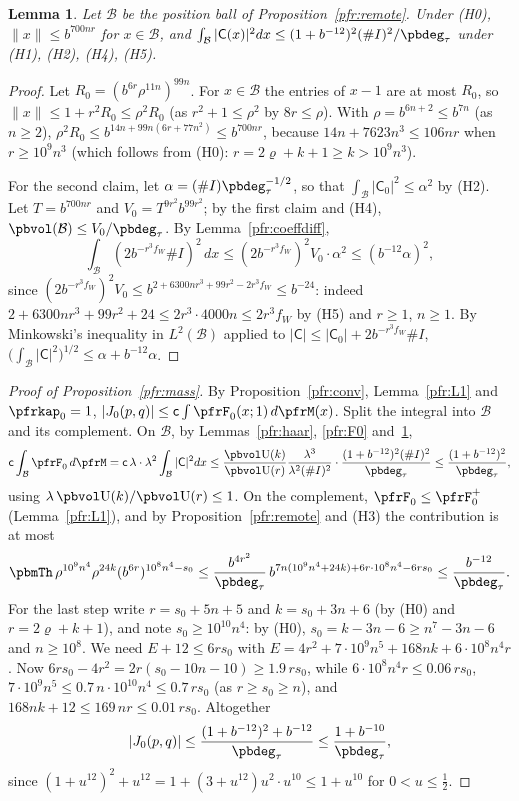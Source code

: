 \documentclass[10pt]{amsart}
\newtheorem{lemma}[theorem]{Lemma}
\theoremstyle{definition}
\theoremstyle{remark}
\providecommand{\auU}{\mathrm U}
\begin{document}
\begin{lemma}\label{pfr:ballnorm}
Let $\mathcal B$ be the position ball of Proposition~\ref{pfr:remote}. Under \textup{(H0)},
$\|x\|\le b^{700nr}$ for $x\in\mathcal B$, and
$\int_{\mathcal B}|\mathsf C(x)|^2dx\le(1+b^{-12})^2(\#I)^2/\pbdeg_\tau$ under \textup{(H1)}, \textup{(H2)},
\textup{(H4)}, \textup{(H5)}.
\end{lemma}
\begin{proof}
Let $R_0=(b^{6r}\rho^{11n})^{99n}$. For $x\in\mathcal B$ the entries of $x-1$ are at most $R_0$, so
$\|x\|\le1+r^2R_0\le\rho^2R_0$ (as $r^2+1\le\rho^2$ by $8r\le\rho$). With $\rho=b^{6n+2}\le b^{7n}$ (as $n\ge2$),
$\rho^2R_0\le b^{14n+99n(6r+77n^2)}\le b^{700nr}$, because $14n+7623n^3\le106nr$ when $r\ge10^9n^3$ (which
follows from (H0): $r=2\varrho+k+1\ge k>10^9n^3$).

For the second claim, let $\alpha=(\#I)\pbdeg_\tau^{-1/2}$, so that $\int_{\mathcal B}|\mathsf C_0|^2\le\alpha^2$ by
(H2). Let $T=b^{700nr}$ and $V_0=T^{9r^2}b^{99r^2}$; by the first claim and (H4),
$\pbvol(\mathcal B)\le V_0/\pbdeg_\tau$. By Lemma~\ref{pfr:coeffdiff},
\[
\int_{\mathcal B}(2b^{-r^3f_W}\#I)^2\,dx\le(2b^{-r^3f_W})^2V_0\cdot\alpha^2\le(b^{-12}\alpha)^2,
\]
since $(2b^{-r^3f_W})^2V_0\le b^{2+6300nr^3+99r^2-2r^3f_W}\le b^{-24}$: indeed $2+6300nr^3+99r^2+24\le
2r^3\cdot4000n\le2r^3f_W$ by (H5) and $r\ge1$, $n\ge1$. By Minkowski's inequality in $L^2(\mathcal B)$
applied to $|\mathsf C|\le|\mathsf C_0|+2b^{-r^3f_W}\#I$,
$\bigl(\int_{\mathcal B}|\mathsf C|^2\bigr)^{1/2}\le\alpha+b^{-12}\alpha$.
\end{proof}

\begin{proof}[Proof of Proposition~\ref{pfr:mass}]
By Proposition~\ref{pfr:conv}, Lemma~\ref{pfr:L1} and $\pfrkap_0=1$,
$|J_0(p,q)|\le\mathsf c\int\pfrF_0(x;1)\,d\pfrM(x)$. Split the integral into $\mathcal B$ and its
complement. On $\mathcal B$, by Lemmas~\ref{pfr:haar}, \ref{pfr:F0} and~\ref{pfr:ballnorm},
\[
\mathsf c\int_{\mathcal B}\pfrF_0\,d\pfrM=\mathsf c\,\lambda\cdot\lambda^2\int_{\mathcal B}|\mathsf C|^2dx\le
\frac{\pbvol\auU(k)}{\pbvol\auU(r)}\frac{\lambda^3}{\lambda^2(\#I)^2}\cdot\frac{(1+b^{-12})^2(\#I)^2}{\pbdeg_\tau}
\le\frac{(1+b^{-12})^2}{\pbdeg_\tau},
\]
using $\lambda\,\pbvol\auU(k)/\pbvol\auU(r)\le1$. On the complement, $\pfrF_0\le\pfrF_0^+$
(Lemma~\ref{pfr:L1}), and by Proposition~\ref{pfr:remote} and (H3) the contribution is at most
\[
\pbmTh\,\rho^{10^9n^4}\rho^{24k}(b^{6r})^{10^8n^4-s_0}\le\frac{b^{4r^2}}{\pbdeg_\tau}\,b^{7n(10^9n^4+24k)+6r\cdot
10^8n^4-6rs_0}\le\frac{b^{-12}}{\pbdeg_\tau}.
\]
For the last step write $r=s_0+5n+5$ and $k=s_0+3n+6$ (by (H0) and $r=2\varrho+k+1$), and note
$s_0\ge10^{10}n^4$: by (H0), $s_0=k-3n-6\ge n^7-3n-6$ and $n\ge10^8$. We need $E+12\le6rs_0$ with
$E=4r^2+7\cdot10^9n^5+168nk+6\cdot10^8n^4r$. Now $6rs_0-4r^2=2r(s_0-10n-10)\ge1.9\,rs_0$, while
$6\cdot10^8n^4r\le0.06\,rs_0$, $7\cdot10^9n^5\le0.7\,n\cdot10^{10}n^4\le0.7\,rs_0$ (as $r\ge s_0\ge n$),
and $168nk+12\le169\,nr\le0.01\,rs_0$. Altogether
\[
|J_0(p,q)|\le\frac{(1+b^{-12})^2+b^{-12}}{\pbdeg_\tau}\le\frac{1+b^{-10}}{\pbdeg_\tau},
\]
since $(1+u^{12})^2+u^{12}=1+(3+u^{12})u^2\cdot u^{10}\le1+u^{10}$ for $0<u\le\frac12$.
\end{proof}
\end{document}

